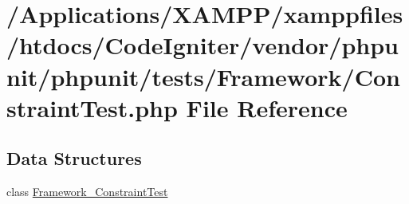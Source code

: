 \hypertarget{_constraint_test_8php}{}\section{/\+Applications/\+X\+A\+M\+P\+P/xamppfiles/htdocs/\+Code\+Igniter/vendor/phpunit/phpunit/tests/\+Framework/\+Constraint\+Test.php File Reference}
\label{_constraint_test_8php}
\subsection*{Data Structures}
\begin{DoxyCompactItemize}
\item 
class \mbox{\hyperlink{class_framework___constraint_test}{Framework\+\_\+\+Constraint\+Test}}
\end{DoxyCompactItemize}
